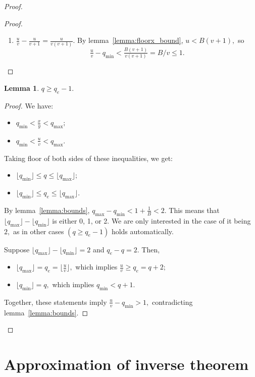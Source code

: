 \documentclass[a4paper,12pt]{article}
\newtheorem{lemma}{Lemma}
\newcommand{\floor}[1] {\lfloor #1 \rfloor}
\begin{document}
\begin{proof}
\begin{proof}
\begin{enumerate}
            \item $\frac{u}{v} - \frac{u}{v+1} = \frac{u}{v(v+1)}.$
            By lemma~\ref{lemma:floorx_bound}, $u < B(v+1),$ so
            $$\tfrac{u}{v} - q_{\min} < \tfrac{B(v+1)}{v(v+1)} = B/v \le 1.$$
        \end{enumerate}
    \end{proof}

    \begin{lemma}
        $q \ge q_e - 1.$
    \end{lemma}
    \begin{proof}
        We have:
        \begin{itemize}
            \item $q_{\min} < \frac{x}{y} < q_{\max};$
            \item $q_{\min} < \frac{u}{v} < q_{\max}.$
        \end{itemize}
        Taking floor of both sides of these inequalities, we get:
        \begin{itemize}
            \item $\floor{q_{\min}} \le q \le \floor{q_{\max}};$
            \item $\floor{q_{\min}} \le q_e \le \floor{q_{\max}}.$
        \end{itemize}
        By lemma~\ref{lemma:bounds}, $q_{\max} - q_{\min} < 1 + \frac{1}{B} < 2.$ This means that
        $\floor{q_{\max}} - \floor{q_{\min}}$ is either 0, 1, or 2.
        We are only interested in the case of it being $2,$ as in other cases $(q \ge q_e-1)$ holds automatically.

        Suppose $\floor{q_{\max}} - \floor{q_{\min}} = 2$ and $q_e - q = 2.$ Then,
        \begin{itemize}
            \item $\floor{q_{\max}} = q_e = \floor{\frac{u}{v}},$ which implies $\frac{u}{v} \ge q_e = q + 2;$
            \item $\floor{q_{\min}} = q,$ which implies $q_{\min} < q + 1.$
        \end{itemize}
        Together, these statements imply $\frac{u}{v} - q_{\min} > 1,$ contradicting lemma~\ref{lemma:bounds}.
    \end{proof}
\end{proof}

\section{Approximation of inverse theorem}
\end{document}
